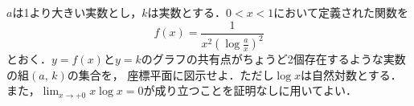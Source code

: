 \documentclass[../../main.tex]{subfiles}
\begin{document}
$a$は1より大きい実数とし，$k$は実数とする．$0<x<1$において定義された関数を
\[ f(x)=\frac{1}{x^2 { \displaystyle \left( \log\frac{a}{x} \right) }^2} \]
とおく．$y=f(x)$と$y=k$のグラフの共有点がちょうど2個存在するような実数の組$(a, \, k)$の集合を，
座標平面に図示せよ．ただし$\log x$は自然対数とする．
また，$\displaystyle\lim_{x\to+0}x\log x=0$が成り立つことを証明なしに用いてよい．
\end{document}
